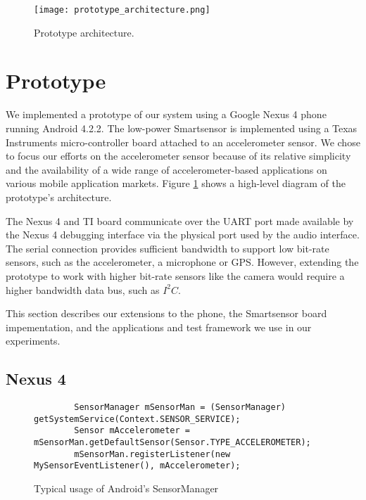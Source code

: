 
\begin{figure}[t]
	\texttt{[image: prototype\_architecture.png]}
	\caption{Prototype architecture.}
    \label{fig:prototypeArchitecture}
\end{figure}

\section{Prototype}
\label{sec:prototype}

We implemented a prototype of our system using a Google Nexus 4 phone
running Android 4.2.2.  The low-power Smartsensor is implemented using
a Texas Instruments micro-controller board attached to an
accelerometer sensor.  We chose to focus our efforts on the
accelerometer sensor because of its relative simplicity and the
availability of a wide range of accelerometer-based applications on
various mobile application markets.  Figure
\ref{fig:prototypeArchitecture} shows a high-level diagram of the
prototype's architecture.

The Nexus 4 and TI board communicate over the UART port made available
by the Nexus 4 debugging interface via the physical port used by the
audio interface.  The serial connection provides sufficient bandwidth
to support low bit-rate sensors, such as the accelerometer, a
microphone or GPS.  However, extending the prototype to work with
higher bit-rate sensors like the camera would require a higher
bandwidth data bus, such as $I^2C$.

This section describes our extensions to the phone, the
Smartsensor board impementation, and the applications and test
framework we use in our experiments.

\subsection{Nexus 4}
\label{subsec:nexus}

\begin{figure*}[t]
{\small
	\begin{verbatim}
		SensorManager mSensorMan = (SensorManager) getSystemService(Context.SENSOR_SERVICE);
		Sensor mAccelerometer = mSensorMan.getDefaultSensor(Sensor.TYPE_ACCELEROMETER);
		mSensorMan.registerListener(new MySensorEventListener(), mAccelerometer);
	\end{verbatim}
}
	\caption{Typical usage of Android's SensorManager}
    \label{fig:androidSensorCodeNormal}
\end{figure*}

